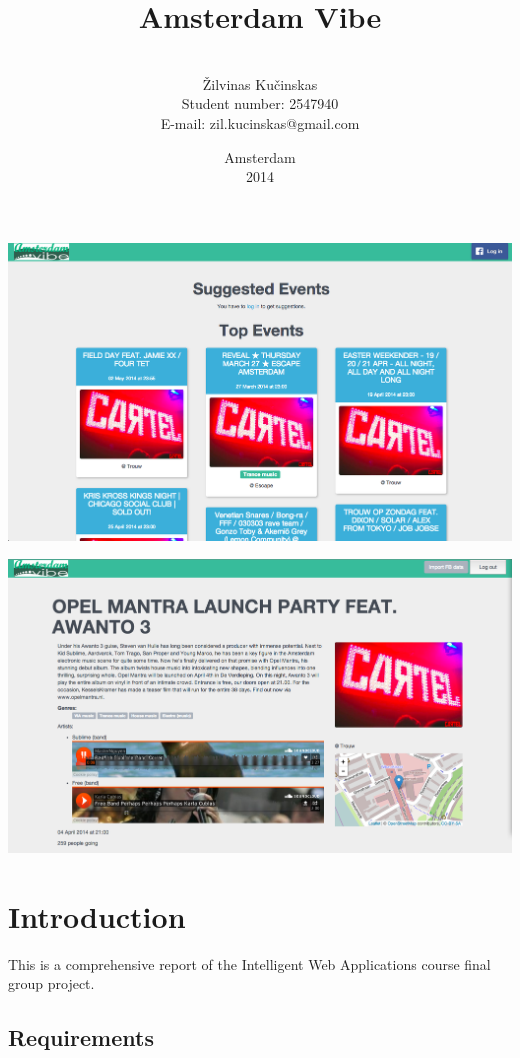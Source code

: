 \documentclass[12pt, a4paper, lithuanian]{article}
\title{Amsterdam Vibe}
\author{
    \\
    Žilvinas Kučinskas \\
    Student number: 2547940 \\
    E-mail: zil.kucinskas@gmail.com
}
\date{Amsterdam \\ 2014}
\begin{document}
\maketitle

\includegraphics[width=\linewidth]{list}

\vspace{1cm}

\includegraphics[width=\linewidth]{detail}

\tableofcontents

\section{Introduction}

This is a comprehensive report of the Intelligent Web Applications course final group project.

\subsection{Requirements}
\end{document}
